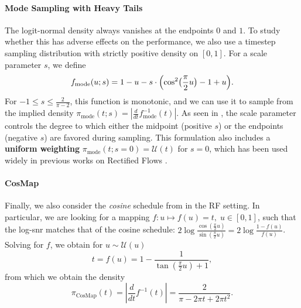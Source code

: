 \paragraph{Mode Sampling with Heavy Tails}
%
%
The logit-normal density always vanishes at the endpoints $0$ and $1$. To study
whether this has adverse effects on the performance, we also use a timestep
sampling distribution with strictly positive density on $[0, 1]$. For a scale
parameter $s$, we define
\begin{equation}
f_{\text{mode}}(u; s) = 1 - u - s\cdot\Bigl(\cos^2\bigl(\frac{\pi}{2} u\bigr) - 1 + u\Bigr).
\label{eq:modesampler}
\end{equation}
For $ -1 \leq s \leq \frac{2}{\pi -2}$, this function is
monotonic, and we can use it to sample from the implied density
$\pi_{\text{mode}}(t; s) = \left| \frac{d}{dt} f_{\text{mode}}^{-1}(t) \right|$.
%
%
As seen in , the scale parameter controls the degree to which either
the midpoint (positive $s$) or the endpoints (negative $s$) are favored during sampling.
This formulation also includes a \textbf{uniform weighting}
$\pi_{\text{mode}}(t; s=0) = \mathcal{U}(t)$ for $s=0$, which has been used
widely in previous works on Rectified Flows \cite{liu2022flow,ma2024sit}.

\paragraph{CosMap}
Finally, we also consider the \emph{cosine} schedule \cite{nichol2021improved}
from  in the RF setting. 
In particular, we are looking for a mapping $f: u \mapsto f(u) = t, \; u \in [0, 1]$, %
such that the log-snr matches that of the cosine schedule: $2 \log \frac{\cos(\frac{\pi}{2}u)}{\sin(\frac{\pi}{2}u)} = 2 \log \frac{1-f(u)}{f(u)}$. 
Solving for $f$, we obtain for $u \sim \mathcal{U}(u)$
\begin{equation}
t = f(u) = 1 - \frac{1}{\tan(\frac{\pi}{2} u) + 1}, 
\label{eq:cosmap}
\end{equation}
from which we obtain the density 
\begin{equation}
\pi_{\text{CosMap}}(t) = \left| \frac{d}{dt} f^{-1}(t) \right| = \frac{2}{\pi - 2\pi t + 2\pi t^2}.
\label{eq:cosmapdensity}
\end{equation}
%
%



%
%




%
%
%
%
%

